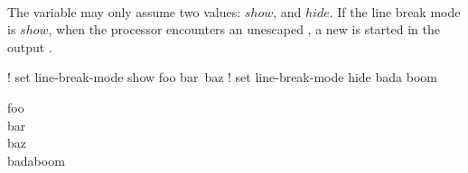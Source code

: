  \\

The  variable may only assume two values: \inline$show$, and \inline$hide$. If the line break mode is \inline$show$, when the processor encounters an unescaped , a new  is started in the output . \\

\begin{examples}
\begin{examplesource}
! set line-break-mode show
foo
bar\
baz
! set line-break-mode hide
bada
boom
\end{examplesource}
  \begin{exampleoutput}
    foo\\
    bar\\
    baz\\
    badaboom
  \end{exampleoutput}
\end{examples}

